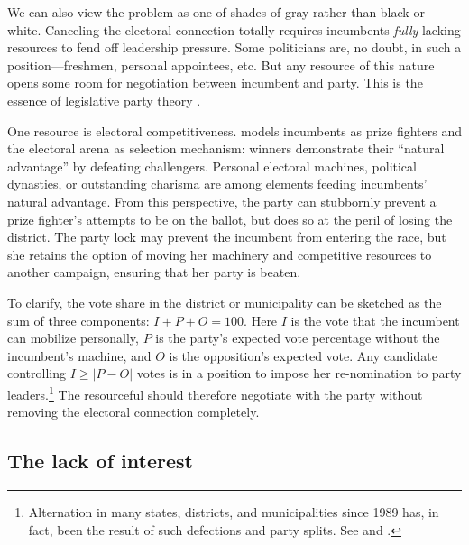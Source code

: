\documentclass[letter,12pt]{article}
\begin{document}

We can also view the problem as one of shades-of-gray rather than black-or-white. Canceling the electoral connection totally requires incumbents \emph{fully} lacking resources to fend off leadership pressure. Some politicians are, no doubt, in such a position---freshmen, personal appointees, etc. But any resource of this nature opens some room for negotiation between incumbent and party. This is the essence of legislative party theory \citep{cox.mccubbins.2007leviath2nd,aldrich.rohdeCPG2001}.

One resource is electoral competitiveness. \citet{zallerprizeFighters} models incumbents as prize fighters and the electoral arena as selection mechanism: winners demonstrate their ``natural advantage'' by defeating challengers. Personal electoral machines, political dynasties, or outstanding charisma are among elements feeding incumbents' natural advantage. From this perspective, the party can stubbornly prevent a prize fighter's attempts to be on the ballot, but does so at the peril of losing the district. The party lock may prevent the incumbent from entering the race, but she retains the option of moving her machinery and competitive resources to another campaign, ensuring that her party is beaten.

To clarify, the vote share in the district or municipality can be sketched as the sum of three components: $I + P + O = 100$. Here $I$ is the vote that the incumbent can mobilize personally, $P$ is the party's expected vote percentage without the incumbent's machine, and $O$ is the opposition's expected vote. Any candidate controlling $I \ge |P-O|$ votes is in a position to impose her re-nomination to party leaders.\footnote{Alternation in many states, districts, and municipalities since 1989 has, in fact, been the result of such defections and party splits. See \citet{garrido-phd.2014} and \citet{diaz-estevez-magaloni-Poverty-book.2016}.} The resourceful should therefore negotiate with the party without removing the electoral connection completely.

\subsection{The lack of interest}
\end{document}
